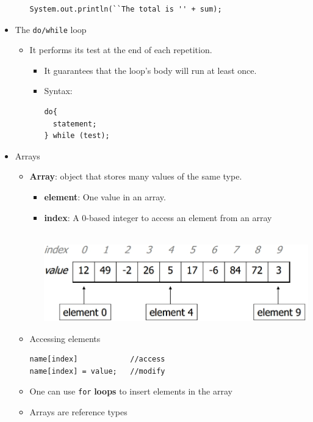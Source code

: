\documentclass[a4paper]{article}
\newcommand{\inline}[1]{\lstinline!#1!}%
\begin{document}
\begin{itemize}
\begin{itemize}
\begin{lstlisting}
System.out.println(``The total is '' + sum);
    \end{lstlisting}
  \end{itemize}
\item The \inline{do/while} loop
  \begin{itemize}
    \item It performs its test at the end of each repetition.
      \begin{itemize}
        \item It guarantees that the loop's { } body will run at least once.
        \item Syntax:
\begin{lstlisting}
do{
  statement;
} while (test);
\end{lstlisting}
      \end{itemize}
  \end{itemize}
\item Arrays
  \begin{itemize}
    \item \textbf{Array}: object that stores many values of the same type.
      \begin{itemize}
        \item \textbf{element}: One value in an array.
        \item \textbf{index}: A 0-based integer to access an element from an array\\
        \\
        \begin{center}
        \includegraphics[scale=1]{Figures/ArrayExample.jpg}
        \end{center}
      \end{itemize}
    \item Accessing elements\\
      \begin{lstlisting}
name[index]            //access
name[index] = value;   //modify
      \end{lstlisting}
      \item One can use \inline{for} \textbf{loops} to insert elements in the array
      \item Arrays are reference types

\end{itemize}
\end{itemize}
\end{document}
